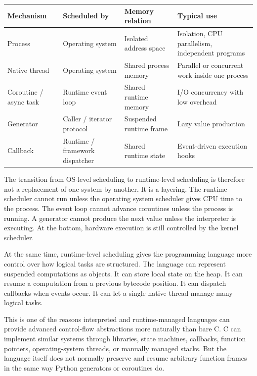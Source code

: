 \begin{center}
\begin{tabular}{|p{}|p{}|p{}|p{}|}
\hline
\textbf{Mechanism} & \textbf{Scheduled by} & \textbf{Memory relation} & \textbf{Typical use} \\
\hline
Process & Operating system & Isolated address space & Isolation, CPU parallelism, independent programs \\
\hline
Native thread & Operating system & Shared process memory & Parallel or concurrent work inside one process \\
\hline
Coroutine / async task & Runtime event loop & Shared runtime memory & I/O concurrency with low overhead \\
\hline
Generator & Caller / iterator protocol & Suspended runtime frame & Lazy value production \\
\hline
Callback & Runtime / framework dispatcher & Shared runtime state & Event-driven execution hooks \\
\hline
\end{tabular}
\end{center}

The transition from OS-level scheduling to runtime-level scheduling is therefore not a replacement of one system by another. It is a layering. The runtime scheduler cannot run unless the operating system scheduler gives CPU time to the process. The event loop cannot advance coroutines unless the process is running. A generator cannot produce the next value unless the interpreter is executing. At the bottom, hardware execution is still controlled by the kernel scheduler.

At the same time, runtime-level scheduling gives the programming language more control over how logical tasks are structured. The language can represent suspended computations as objects. It can store local state on the heap. It can resume a computation from a previous bytecode position. It can dispatch callbacks when events occur. It can let a single native thread manage many logical tasks.

This is one of the reasons interpreted and runtime-managed languages can provide advanced control-flow abstractions more naturally than bare C. C can implement similar systems through libraries, state machines, callbacks, function pointers, operating-system threads, or manually managed stacks. But the language itself does not normally preserve and resume arbitrary function frames in the same way Python generators or coroutines do.

